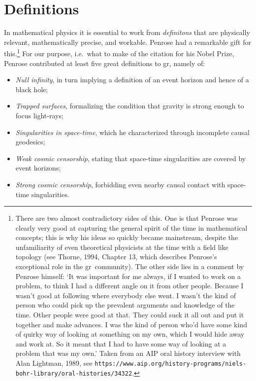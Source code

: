 \documentclass[12pt]{article}
\newcommand{\GR}{{\sc gr}}
\begin{document}
 \section{Definitions}\label{Defs}
In mathematical physics it is essential to work from  \emph{definitons} that are physically relevant, mathematically precise, and workable. Penrose had a remarkable gift for this.\footnote{There are two almost contradictory sides of this. One is that Penrose was clearly very good at capturing the general spirit of the time in mathematical concepts; this is why his ideas so quickly became mainstream, despite the unfamiliarity of even theoretical physicists at the time with a field like topology (see
Thorne, 1994, Chapter 13, which describes  Penrose's exceptional role in the \GR\ community).  The other side lies in a
comment by Penrose himself: `It was important for me always, if I wanted to work on a problem, to think I had a different angle on it from other people. Because I wasn't good at following where everybody else went. I wasn't the kind of person who could pick up the prevalent arguments and knowledge of the time. Other people were good at that. They could suck it all out and put it together and make advances. I was the kind of person who'd have some kind of quirky way of looking at something on my own, which I would hide away and work at. So it meant that I had to have some way of looking at a problem that was my own.'  Taken from an AIP oral history interview with Alan Lightman, 1989, see \texttt{https://www.aip.org/history-programs/niels-bohr-library/oral-histories/34322}. }
For our purpose, i.e.\ what to make of the citation for his Nobel Prize,
 Penrose contributed at least five great definitions to \GR, namely of:
\begin{itemize}
\item \emph{Null infinity}, in turn implying a definition of an event horizon and hence of a black hole;
\item \emph{Trapped surfaces}, formalizing the condition that gravity is strong enough to focus light-rays;
\item \emph{Singularities in space-time}, which he characterized through incomplete causal geodesics;
\item \emph{Weak cosmic censorship}, stating that space-time singularities are covered by event horizons;
\item \emph{Strong  cosmic censorship}, forbidding even nearby causal contact with  space-time singularities.
\end{itemize}
\end{document}
